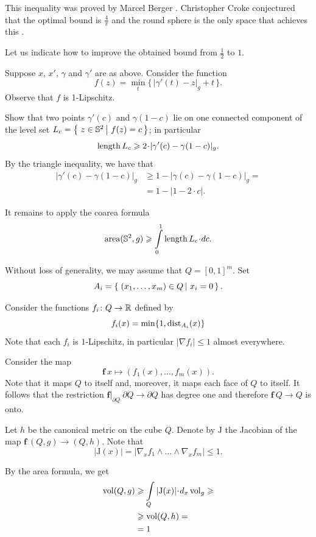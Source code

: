 This inequality was proved by Marcel Berger \cite{berger}. 
Christopher Croke conjectured that the optimal bound is $\tfrac4\pi$ and the round sphere is the only space that achieves this \cite[see Conjecture 0.3 in][]{croke}.

Let us indicate how to improve the obtained bound from $\tfrac12$ to $1$.

Suppose $x$, $x'$, $\gamma$ and $\gamma'$ are as above.
Consider the function
\[f(z)=\min_t \{\,|\gamma'(t)-z|_g+t\,\}.\]
Observe that $f$ is 1-Lipschitz.

Show that two points $\gamma'(c)$ and $\gamma(1-c)$ lie on one connected component of the level set $L_c=\set{z\in\mathbb{S}^2}{f(z)=c}$;
in particular 
\[\length L_c\ge 2\cdot|\gamma'(c)-\gamma(1-c)|_g.\]
By the triangle inequality, we have that
\begin{align*}
|\gamma'(c)-\gamma(1-c)|_g&\ge 1-|\gamma(c)-\gamma(1-c)|_g=
\\
&=1-|1-2\cdot c|.
\end{align*}

It remains to apply the coarea formula
\[\area(\mathbb{S}^2,g)\ge \int\limits_0^1\length L_c\cdot dc.\]


Without loss of generality, we may assume that $Q=[0,1]^m$.
Set 
\[A_i=\set{(x_1,\dots,x_m)\in Q}{x_i=0}.\]

Consider the functions $f_i\colon Q\to\mathbb{R}$ defined by
$$f_i(x)=\min \{1,\operatorname{\rm dist}\nolimits_{A_i}(x)\}$$
Note that each $f_i$ is $1$-Lipschitz, 
in particular $|\nabla f_i|\le 1$ almost everywhere.

Consider the map
\[\bm{f}\:x\mapsto(f_1(x),\dots,f_m(x)).\]
Note that it maps $Q$ to itself
and, moreover, it maps each face of $Q$ to itself.
It follows that the restriction $\bm{f}|_{\partial Q}\:\partial Q\to \partial Q$ has degree one and therefore 
$\bm{f}\:Q\to Q$ is onto.

Let $h$ be the canonical metric on the cube $Q$.
Denote by $\mathrm{J}$ the Jacobian of the map $\bm{f}\:(Q,g)\to (Q,h)$.
Note that 
\[|\mathrm{J}(x)|=|\nabla_x f_1\wedge\dots\wedge\nabla_xf_m|\le 1.\]

By the area formula, we get 
\begin{align*}
\vol(Q,g)
&\ge \int\limits_Q|\mathrm{J}(x)|\cdot d_x\vol_g\ge
\\
&\ge\vol(Q,h)=\\
&=1
\end{align*}

